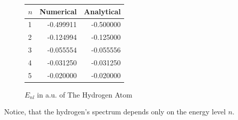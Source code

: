 \documentclass[a4paper, 12pt]{article}
\begin{document}
\begin{figure}[h!]
\centering
\begin{tabular}{lrr}
\toprule
\centering
$n$ &         Numerical &         Analytical \\
\midrule
1 & -0.499911 & -0.500000 \\
2 & -0.124994 & -0.125000 \\
3 & -0.055554 & -0.055556 \\
4 & -0.031250 & -0.031250 \\
5 & -0.020000 & -0.020000 \\
\bottomrule
\end{tabular}
\caption{$E_{nl}$ in a.u. of The Hydrogen Atom}
\end{figure}
Notice, that the hydrogen's spectrum depends only on the energy level $n.$




%
%
\end{document}
